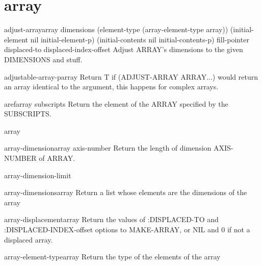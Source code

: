 
\section{array}

\begin{function}{adjust-array}{array dimensions \key (element-type (array-element-type array))
 (initial-element nil initial-element-p)
 (initial-contents nil initial-contents-p) fill-pointer displaced-to
 displaced-index-offset}{}
  Adjust ARRAY's dimensions to the given DIMENSIONS and stuff.
\end{function}

\begin{function}{adjustable-array-p}{array}{}
  Return T if (ADJUST-ARRAY ARRAY...) would return an array identical
   to the argument, this happens for complex arrays.
\end{function}

\begin{accessor}{aref}{array \rest subscripts}{}
  Return the element of the ARRAY specified by the SUBSCRIPTS.
\end{accessor}

\begin{class}{array}{}{}
  
\end{class}

\begin{function}{array-dimension}{array axis-number}{}
  Return the length of dimension AXIS-NUMBER of ARRAY.
\end{function}

\begin{constant}{array-dimension-limit}{}{}
  
\end{constant}

\begin{function}{array-dimensions}{array}{}
  Return a list whose elements are the dimensions of the array
\end{function}

\begin{function}{array-displacement}{array}{}
  Return the values of :DISPLACED-TO and :DISPLACED-INDEX-offset
   options to MAKE-ARRAY, or NIL and 0 if not a displaced array.
\end{function}

\begin{function}{array-element-type}{array}{}
  Return the type of the elements of the array
\end{function}

